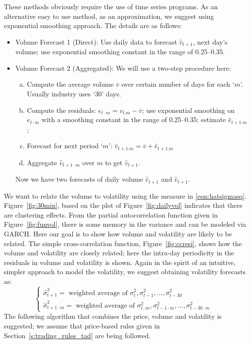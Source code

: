 	
These methods obviously require the use of time series programs. As an alternative easy to use method, as an approximation, we suggest using exponential smoothing approach. The details are as follows:
	\begin{itemize}
	\item Volume Forecast 1 (Direct): Use daily data to forecast $\hat{v}_{t+1}$, next day's volume; use exponential smoothing constant in the range of 0.25--0.35.
	\item Volume Forecast 2 (Aggregated): We will use a two-step procedure here:
		\begin{enumerate}[(a)]
		\item Compute the average volume $\overline{v}$ over certain number of days for each `$m$'. Usually industry uses `30' days.
		\item Compute the residuals: $e_{t\cdot m} = v_{t . m} - \overline{v}$; use exponential smoothing on $e_{t\cdot m}$ with a smoothing constant in the range of 0.25--0.35; estimate $\hat{e}_{t+1 . m}$;
		\item Forecast for next period `$m$': $\hat{v}_{t+1. m}=\overline{v}+\hat{e}_{t+1 . m}$
		\item Aggregate $\hat{v}_{t+1\cdot m}$ over $m$ to get $\hat{v}_{t+1}$. 
		\end{enumerate}
	Now we have two forecasts of daily volume $\hat{v}_{t+1}$ and $\hat{v}_{t+1}$.
	\end{itemize}
We want to relate the volume to volatility using the measure in \eqref{eqn:hatsigmasq}. Figure~\ref{fig:30min}, based on the plot of Figure~\ref{fig:dailyvol} indicates that there are clustering effects. From the partial autocorrelation function given in Figure~\ref{fig:funvol}, there is some memory in the variance and can be modeled via GARCH. Here our goal is to show how volume and volatility are likely to be related. The simple cross-correlation function, Figure~\ref{fig:ccresi}, shows how the volume and volatility are closely related; here the intra-day periodicity in the residuals in volume and volatility is shown. Again in the spirit of an intuitive, simpler approach to model the volatility, we suggest obtaining volatility forecasts as:
	\[
	\begin{cases}
	\hat{\sigma}_{t+1}^2 = \text{ weighted average of } \sigma_t^2, \sigma_{t-1}^2, \ldots, \sigma_{t-30}^2 & \\
	\hat{\sigma}^2_{t+1 \cdot m}= \text{ weighted average of } \sigma_{t\cdot m}^2, \sigma_{t-1 \cdot m}^2, \ldots, \sigma_{t-30\cdot m}^2 & 
	\end{cases}
	\]
The following algorithm that combines the price, volume and volatility is suggested; we assume that price-based rules given in Section~\ref{s:trading_rules_tad} are being followed.

